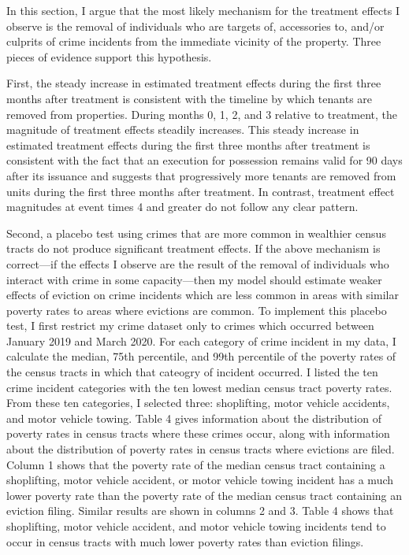 \documentclass[12pt]{article}
\begin{document}
    In this section, I argue that the most likely mechanism for the treatment effects I observe is the removal of individuals who are targets of, accessories to, and/or culprits of crime incidents from the immediate vicinity of the property. Three pieces of evidence support this hypothesis.


    First, the steady increase in estimated treatment effects during the first three months after treatment is consistent with the timeline by which tenants are removed from properties. During months 0, 1, 2, and 3 relative to treatment, the magnitude of treatment effects steadily increases. This steady increase in estimated treatment effects during the first three months after treatment is consistent with the fact that an execution for possession remains valid for 90 days after its issuance and suggests that progressively more tenants are removed from units during the first three months after treatment. In contrast, treatment effect magnitudes at event times 4 and greater do not follow any clear pattern.


    Second, a placebo test using crimes that are more common in wealthier census tracts do not produce significant treatment effects. If the above mechanism is correct—if the effects I observe are the result of the removal of individuals who interact with crime in some capacity—then my model should estimate weaker effects of eviction on crime incidents which are less common in areas with similar poverty rates to areas where evictions are common. To implement this placebo test, I first restrict my crime dataset only to crimes which occurred between January 2019 and March 2020. For each category of crime incident in my data, I calculate the median, 75th percentile, and 99th percentile of the poverty rates of the census tracts in which that cateogry of incident occurred. I listed the ten crime incident categories with the ten lowest median census tract poverty rates. From these ten categories, I selected three: shoplifting, motor vehicle accidents, and motor vehicle towing. Table 4 gives information about the distribution of poverty rates in census tracts where these crimes occur, along with information about the distribution of poverty rates in census tracts where evictions are filed. Column 1 shows that the poverty rate of the median census tract containing a shoplifting, motor vehicle accident, or motor vehicle towing incident has a much lower poverty rate than the poverty rate of the median census tract containing an eviction filing. Similar results are shown in columns 2 and 3. Table 4 shows that shoplifting, motor vehicle accident, and motor vehicle towing incidents tend to occur in census tracts with much lower poverty rates than eviction filings. 
\end{document}
